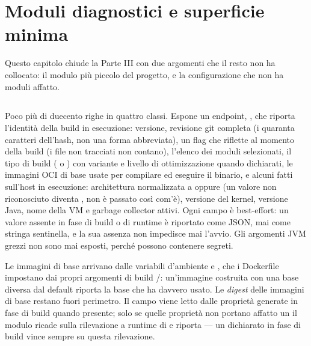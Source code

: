 \chapter{Moduli diagnostici e superficie minima}
\label{cap:16-moduli-diagnostici}

Questo capitolo chiude la Parte III con due argomenti che il resto non ha
collocato: il modulo pi\`u piccolo del progetto, e la configurazione che non ha
moduli affatto.

\section{}

Poco pi\`u di duecento righe in quattro classi. Espone un endpoint,
, che riporta l'identit\`a della build in
esecuzione: versione, revisione git completa (i quaranta caratteri
dell'hash, non una forma abbreviata), un flag  che riflette
 al momento della build
(i file non tracciati non contano), l'elenco dei moduli selezionati, il tipo
di build ( o ) con variante e livello di
ottimizzazione quando dichiarati, le immagini OCI di base usate per compilare
ed eseguire il binario, e alcuni fatti sull'host in esecuzione: architettura
normalizzata a  oppure  (un valore non riconosciuto
diventa , non \`e passato cos\`i com'\`e), versione del kernel,
versione Java, nome della VM e garbage collector attivi. Ogni campo \`e
best-effort: un valore assente in fase di build o di runtime \`e riportato
come  JSON, mai come stringa sentinella, e la sua assenza non
impedisce mai l'avvio. Gli argomenti JVM grezzi non sono mai esposti, perch\'e
possono contenere segreti.

Le immagini di base arrivano dalle variabili d'ambiente
 e ,
che i Dockerfile impostano dai propri argomenti di build
/: un'immagine costruita con una
base diversa dal default riporta la base che ha davvero usato. Le
\emph{digest} delle immagini di base restano fuori perimetro. Il campo
 viene letto dalle propriet\`a generate in fase di build
quando presente; solo se quelle propriet\`a non portano affatto un
 il modulo ricade sulla rilevazione a runtime di
 e riporta  --- un
 dichiarato in fase di build vince sempre su questa rilevazione.

